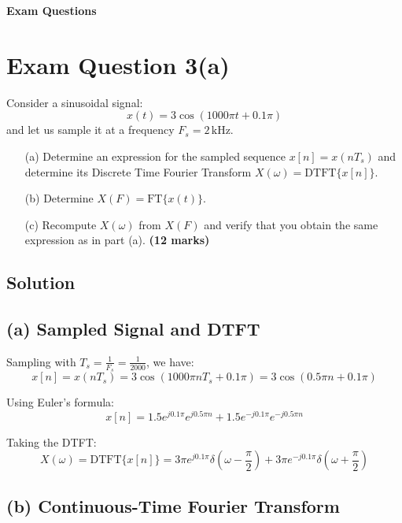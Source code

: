 \documentclass[12pt]{article}
\begin{document}
	\newpage
	\bigskip
	\begin{center}
		\textbf{\LARGE Exam Questions}
	\end{center}
	
	\bigskip
	
	\section*{Exam Question 3(a)}
	
	Consider a sinusoidal signal:  
	\[
	x(t) = 3 \cos(1000\pi t + 0.1\pi)
	\]  
	and let us sample it at a frequency \( F_s = 2 \, \text{kHz} \).
	
	\begin{enumerate}
		\item[(a)] Determine an expression for the sampled sequence \( x[n] = x(nT_s) \) and determine its Discrete Time Fourier Transform \( X(\omega) = \text{DTFT}\{x[n]\} \).
		\item[(b)] Determine \( X(F) = \text{FT}\{x(t)\} \).
		\item[(c)] Recompute \( X(\omega) \) from \( X(F) \) and verify that you obtain the same expression as in part (a).  \textbf{(12 marks)}
	\end{enumerate}
	
	\subsection*{Solution}
	
	\subsection*{(a) Sampled Signal and DTFT}
	
	Sampling with \( T_s = \frac{1}{F_s} = \frac{1}{2000} \), we have:  
	\[
	x[n] = x(nT_s) = 3 \cos(1000\pi n T_s + 0.1\pi) = 3 \cos(0.5\pi n + 0.1\pi)
	\]
	
	Using Euler’s formula:
	\[
	x[n] = 1.5 e^{j0.1\pi} e^{j0.5\pi n} + 1.5 e^{-j0.1\pi} e^{-j0.5\pi n}
	\]
	
	Taking the DTFT:
	\[
	X(\omega) = \text{DTFT}\{x[n]\} = 3\pi e^{j0.1\pi} \delta\left(\omega - \frac{\pi}{2}\right) + 3\pi e^{-j0.1\pi} \delta\left(\omega + \frac{\pi}{2}\right)
	\]
	
	\subsection*{(b) Continuous-Time Fourier Transform}
	
\end{document}
